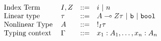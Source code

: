 \documentclass[a4paper,11pt]{article}
\theoremstyle{definition}
\begin{document}
\[
\begin{array}{llll}
  \mbox{Index Term} & I, Z & ::= &     i ~|~ n \\
  \mbox{Linear type} & \tau &::=  &  A \multimap{Z} \tau ~|~
                                     \mathtt{b} ~|~ \mathtt{bool} \\
  \mbox{Nonlinear Type} & A & ::= & !_{I} \tau   \\
  \mbox{Typing context } & \Gamma & ::= & x_1 : A_1, \ldots,
                                          x_n : A_n
\end{array}
\]
\end{document}
